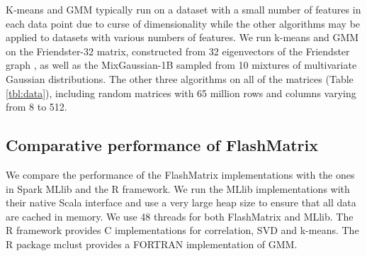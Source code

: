 K-means and GMM typically run on a dataset with a small number of features
in each data point due to curse of dimensionality \cite{Jain00} while
the other algorithms may be applied to datasets with various numbers of
features.
We run k-means and GMM on
the Friendster-32 matrix, constructed from 32 eigenvectors of the Friendster
graph \cite{friendster}, as well as the MixGaussian-1B
sampled from 10 mixtures of multivariate Gaussian distributions.
The other three algorithms on all of the matrices (Table \ref{tbl:data}),
including random matrices with 65 million rows and columns
varying from 8 to 512.

%


\subsection{Comparative performance of FlashMatrix}

We compare the performance of the FlashMatrix implementations with the ones in
Spark MLlib \cite{mllib} and the R framework. We run the MLlib implementations
with their native Scala interface and use a very large heap size to ensure that
all data are cached in memory. We use 48 threads for both FlashMatrix and
MLlib. %
The R framework provides C implementations for correlation, SVD and k-means.
The R package mclust \cite{mclust} provides a FORTRAN implementation of GMM.

